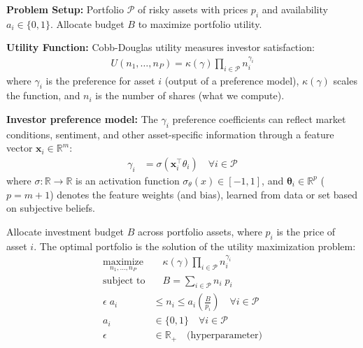 \documentclass[aspectratio=169]{beamer}
\begin{document}
\begin{frame}
\textbf{Problem Setup:} Portfolio $\mathcal{P}$ of risky assets with prices $p_i$ and availability $a_i \in \{0,1\}$. Allocate budget $B$ to maximize portfolio utility.
\end{frame}

\begin{frame}
\textbf{Utility Function:} Cobb-Douglas utility measures investor satisfaction:
\begin{align*}
U(n_1, \dots, n_P) = \kappa(\gamma) \prod_{i \in \mathcal{P}} n_i^{\gamma_i}
\end{align*}
where $\gamma_i$ is the preference for asset $i$ (output of a preference model), $\kappa(\gamma)$ scales the function, and $n_i$ is the number of shares (what we compute).
\end{frame}

\begin{frame}
\textbf{Investor preference model:} The $\gamma_{i}$ preference coefficients can reflect market conditions, sentiment, and other asset-specific information through a feature vector $\mathbf{x}_{i}\in\mathbb{R}^{m}$:
\begin{align*}
\gamma_{i} & = \sigma\left(\mathbf{x}^{\top}_{i}\theta_{i}\right)\quad\forall{i}\in\mathcal{P}
\end{align*}
where $\sigma:\mathbb{R}\rightarrow\mathbb{R}$ is an activation function $\sigma_{\theta}(x)\in[-1,1]$,
and $\mathbf{\theta}_{i}\in\mathbb{R}^{p}$ ($p=m+1$) denotes the feature weights (and bias), learned from data or set based on subjective beliefs.
\end{frame}

\begin{frame}
Allocate investment budget $B$ across portfolio assets, where $p_i$ is the price of asset $i$.
The optimal portfolio is the solution of the utility maximization problem:
\begin{align*}
    \underset{n_{1},\dots,n_{P}}{\text{maximize}} &\quad \kappa(\gamma)\prod_{i\in\mathcal{P}}n_{i}^{\gamma_{i}} \\
    \text{subject to}&\quad B =  \sum_{i\in\mathcal{P}}n_{i}\;{p}_{i}\\
    \epsilon\;{a_{i}}&\leq n_{i} \leq{a_{i}}\left(\frac{B}{p_{i}}\right)\quad{\forall{i}\in\mathcal{P}}\\
    a_{i} &\in\{0,1\}\quad{\forall{i}\in\mathcal{P}}\\
    \epsilon &\in\mathbb{R}_{+} \quad\text{(hyperparameter)}
\end{align*}
\end{frame}
\end{document}
